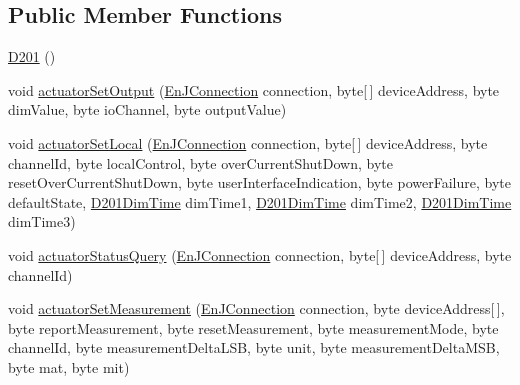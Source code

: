 \subsection*{Public Member Functions}
\begin{DoxyCompactItemize}
\item 
\hyperlink{classit_1_1polito_1_1elite_1_1enocean_1_1enj_1_1eep_1_1eep26_1_1_d2_1_1_d201_1_1_d201_ad9b55a434d1fdce1e516857217ab907a}{D201} ()
\item 
void \hyperlink{classit_1_1polito_1_1elite_1_1enocean_1_1enj_1_1eep_1_1eep26_1_1_d2_1_1_d201_1_1_d201_a973a14de64e7e65106d2c5dc347faf8a}{actuator\+Set\+Output} (\hyperlink{classit_1_1polito_1_1elite_1_1enocean_1_1enj_1_1communication_1_1_en_j_connection}{En\+J\+Connection} connection, byte\mbox{[}$\,$\mbox{]} device\+Address, byte dim\+Value, byte io\+Channel, byte output\+Value)
\item 
void \hyperlink{classit_1_1polito_1_1elite_1_1enocean_1_1enj_1_1eep_1_1eep26_1_1_d2_1_1_d201_1_1_d201_af78093e4cf67badb7625a19a0c0d91be}{actuator\+Set\+Local} (\hyperlink{classit_1_1polito_1_1elite_1_1enocean_1_1enj_1_1communication_1_1_en_j_connection}{En\+J\+Connection} connection, byte\mbox{[}$\,$\mbox{]} device\+Address, byte channel\+Id, byte local\+Control, byte over\+Current\+Shut\+Down, byte reset\+Over\+Current\+Shut\+Down, byte user\+Interface\+Indication, byte power\+Failure, byte default\+State, \hyperlink{enumit_1_1polito_1_1elite_1_1enocean_1_1enj_1_1eep_1_1eep26_1_1_d2_1_1_d201_1_1_d201_dim_time}{D201\+Dim\+Time} dim\+Time1, \hyperlink{enumit_1_1polito_1_1elite_1_1enocean_1_1enj_1_1eep_1_1eep26_1_1_d2_1_1_d201_1_1_d201_dim_time}{D201\+Dim\+Time} dim\+Time2, \hyperlink{enumit_1_1polito_1_1elite_1_1enocean_1_1enj_1_1eep_1_1eep26_1_1_d2_1_1_d201_1_1_d201_dim_time}{D201\+Dim\+Time} dim\+Time3)
\item 
void \hyperlink{classit_1_1polito_1_1elite_1_1enocean_1_1enj_1_1eep_1_1eep26_1_1_d2_1_1_d201_1_1_d201_a39a205035d3d19b057a53d30a54e235a}{actuator\+Status\+Query} (\hyperlink{classit_1_1polito_1_1elite_1_1enocean_1_1enj_1_1communication_1_1_en_j_connection}{En\+J\+Connection} connection, byte\mbox{[}$\,$\mbox{]} device\+Address, byte channel\+Id)
\item 
void \hyperlink{classit_1_1polito_1_1elite_1_1enocean_1_1enj_1_1eep_1_1eep26_1_1_d2_1_1_d201_1_1_d201_a78da556de577e863c9d1ecf8d5d1ac74}{actuator\+Set\+Measurement} (\hyperlink{classit_1_1polito_1_1elite_1_1enocean_1_1enj_1_1communication_1_1_en_j_connection}{En\+J\+Connection} connection, byte device\+Address\mbox{[}$\,$\mbox{]}, byte report\+Measurement, byte reset\+Measurement, byte measurement\+Mode, byte channel\+Id, byte measurement\+Delta\+L\+SB, byte unit, byte measurement\+Delta\+M\+SB, byte mat, byte mit)

\end{DoxyCompactItemize}
